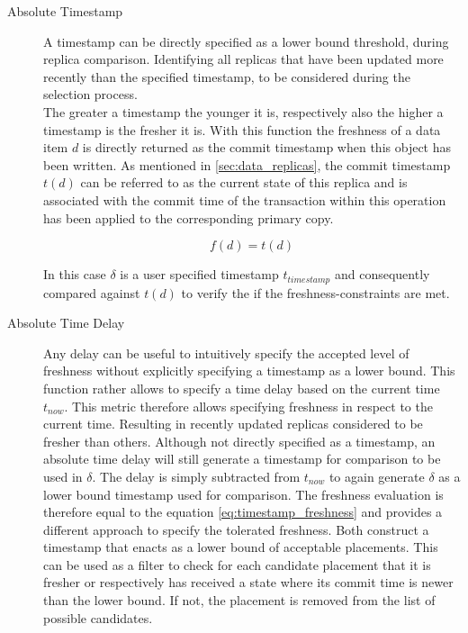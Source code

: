 \begin{description} \label{desc}
    \item [Absolute Timestamp]  A timestamp can be directly specified as a lower bound threshold, during replica comparison. Identifying all replicas that have been updated 
    more recently than the specified timestamp, to be considered during the selection process.\\
    The greater a timestamp the younger it is, respectively also the higher a timestamp is the fresher it is.
    With this function the freshness of a data item $d$ is directly returned as the commit timestamp when this object has been written.
    As mentioned in \ref{sec:data_replicas}, the commit timestamp $t(d)$ can be referred to as the current state of this replica and is associated with the commit time 
    of the transaction within this operation has been applied to the corresponding primary copy.

    \begin{equation} \label{eq:timestamp_freshness}
        f(d) = t(d)
    \end{equation}

    In this case $\delta$ is a user specified timestamp $t_{timestamp}$ and consequently compared against $t(d)$ to verify the if the freshness-constraints are met.


    \item [Absolute Time Delay] Any delay can be useful to intuitively specify the accepted level of freshness without explicitly specifying a timestamp as a lower bound.
    This function rather allows to specify a time delay based on the current time $t_{now}$. 
    This metric therefore allows specifying freshness in respect to the current time. Resulting in recently updated replicas considered to be fresher than others. 
    Although not directly specified as a timestamp, an absolute time delay will still generate a timestamp for comparison to be used in $\delta$.
    The delay is simply subtracted from $t_{now}$ to again generate $\delta$ as a lower bound timestamp used for comparison.
    The freshness evaluation is therefore equal to the equation \ref{eq:timestamp_freshness} and provides a different approach to specify the tolerated freshness.
    Both construct a timestamp that enacts as a lower bound of acceptable placements.
    This can be used as a filter to check for each candidate placement that it is fresher or respectively has received a state where its commit time is newer 
    than the lower bound. If not, the placement is removed from the list of possible candidates. 




\end{description}
